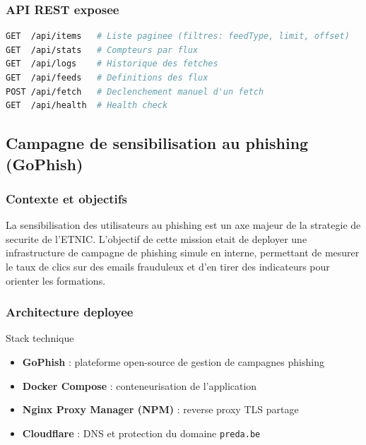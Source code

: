 \documentclass{rapport}
\begin{document}
\subsubsection{API REST exposee}

\begin{lstlisting}[language=bash, caption=Endpoints API CertFR Monitor]
GET  /api/items   # Liste paginee (filtres: feedType, limit, offset)
GET  /api/stats   # Compteurs par flux
GET  /api/logs    # Historique des fetches
GET  /api/feeds   # Definitions des flux
POST /api/fetch   # Declenchement manuel d'un fetch
GET  /api/health  # Health check
\end{lstlisting}

\subsection{Campagne de sensibilisation au phishing (GoPhish)}

\subsubsection{Contexte et objectifs}

La sensibilisation des utilisateurs au phishing est un axe majeur de la
strategie de securite de l'ETNIC. L'objectif de cette mission etait de
deployer une infrastructure de campagne de phishing simule en interne,
permettant de mesurer le taux de clics sur des emails frauduleux et d'en
tirer des indicateurs pour orienter les formations.

\subsubsection{Architecture deployee}

\begin{boitetech}{Stack technique}
\begin{itemize}[noitemsep]
  \item \textbf{GoPhish} : plateforme open-source de gestion de campagnes
        phishing
  \item \textbf{Docker Compose} : conteneurisation de l'application
  \item \textbf{Nginx Proxy Manager (NPM)} : reverse proxy TLS partage
  \item \textbf{Cloudflare} : DNS et protection du domaine
        \texttt{preda.be}
\end{itemize}
\end{boitetech}
\end{document}
